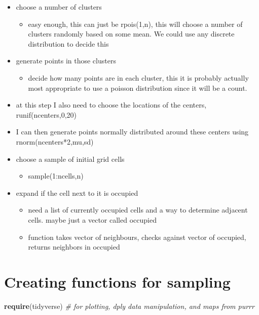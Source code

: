 \documentclass[
]{article}
\newenvironment{Shaded}{\begin{snugshade}}{\end{snugshade}}
\newcommand{\CommentTok}[1]{\textcolor[rgb]{0.56,0.35,0.01}{\textit{#1}}}
\newcommand{\FunctionTok}[1]{\textcolor[rgb]{0.13,0.29,0.53}{\textbf{#1}}}
\newcommand{\NormalTok}[1]{#1}
\providecommand{\tightlist}{%
  \setlength{\itemsep}{0pt}\setlength{\parskip}{0pt}}
\begin{document}
\begin{itemize}
\tightlist
\item
  choose a number of clusters

  \begin{itemize}
  \tightlist
  \item
    easy enough, this can just be rpois(1,n), this will choose a number
    of clusters randomly based on some mean. We could use any discrete
    distribution to decide this
  \end{itemize}
\item
  generate points in those clusters

  \begin{itemize}
  \tightlist
  \item
    decide how many points are in each cluster, this it is probably
    actually most appropriate to use a poisson distribution since it
    will be a count.
  \end{itemize}
\item
  at this step I also need to choose the locations of the centers,
  runif(ncenters,0,20)
\item
  I can then generate points normally distributed around these centers
  using rnorm(ncenters*2,mu,sd)
\item
  choose a sample of initial grid cells

  \begin{itemize}
  \tightlist
  \item
    sample(1:ncells,n)
  \end{itemize}
\item
  expand if the cell next to it is occupied

  \begin{itemize}
  \tightlist
  \item
    need a list of currently occupied cells and a way to determine
    adjacent cells. maybe just a vector called occupied
  \item
    function takes vector of neighbours, checks against vector of
    occupied, returns neighbors in occupied
  \end{itemize}
\end{itemize}

\section{Creating functions for
sampling}\label{creating-functions-for-sampling}

\begin{Shaded}
\begin{Highlighting}[]
\FunctionTok{require}\NormalTok{(tidyverse) }\CommentTok{\# for plotting, dply data manipulation, and maps from purrr}
\end{Highlighting}
\end{Shaded}
\end{document}
